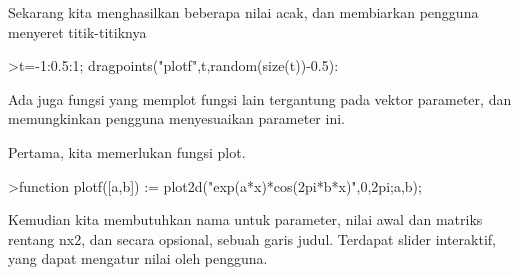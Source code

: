 \documentclass[12pt,arial,letterpaper]{book}
\begin{document}
\begin{eulernootebook}
\begin{eulercomment}
\begin{eulercomment}
\begin{eulernootebook}
\begin{eulercomment}
\begin{eulercomment}
\begin{eulercomment}
\begin{eulercomment}
\begin{eulercomment}
\begin{eulercomment}
\begin{eulercomment}
\begin{eulernotebook}
\begin{eulercomment}
\begin{eulercomment}
\begin{eulercomment}
\begin{eulercomment}
\begin{eulercomment}
Sekarang kita menghasilkan beberapa nilai acak, dan membiarkan
pengguna menyeret titik-titiknya
\end{eulercomment}
\begin{eulerprompt}
>t=-1:0.5:1; dragpoints("plotf",t,random(size(t))-0.5):
\end{eulerprompt}
\begin{eulercomment}
Ada juga fungsi yang memplot fungsi lain tergantung pada vektor
parameter, dan memungkinkan pengguna menyesuaikan parameter ini.

Pertama, kita memerlukan fungsi plot.
\end{eulercomment}
\begin{eulerprompt}
>function plotf([a,b]) := plot2d("exp(a*x)*cos(2pi*b*x)",0,2pi;a,b);
\end{eulerprompt}
\begin{eulercomment}
Kemudian kita membutuhkan nama untuk parameter, nilai awal dan matriks
rentang nx2, dan secara opsional, sebuah garis judul. Terdapat slider
interaktif, yang dapat mengatur nilai oleh pengguna. 


\end{eulercomment}
\end{eulercomment}
\end{eulercomment}
\end{eulercomment}
\end{eulercomment}
\end{eulernotebook}
\end{eulercomment}
\end{eulercomment}
\end{eulercomment}
\end{eulercomment}
\end{eulercomment}
\end{eulercomment}
\end{eulercomment}
\end{eulernootebook}
\end{eulercomment}
\end{eulercomment}
\end{eulernootebook}
\end{document}
